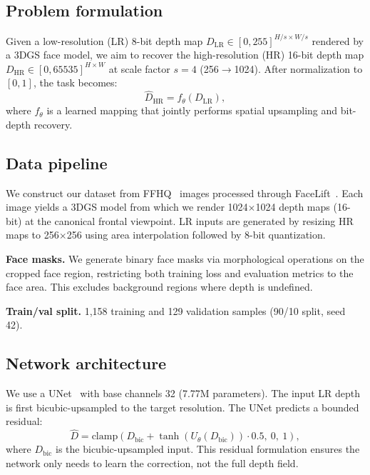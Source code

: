 \documentclass[10pt,twocolumn,letterpaper]{article}
\begin{document}
\subsection{Problem formulation}
Given a low-resolution (LR) 8-bit depth map $D_{\text{LR}} \in [0, 255]^{H/s \times W/s}$ rendered by a 3DGS face model, we aim to recover the high-resolution (HR) 16-bit depth map $D_{\text{HR}} \in [0, 65535]^{H \times W}$ at scale factor $s=4$ (256$\to$1024).
After normalization to $[0,1]$, the task becomes:
\begin{equation}
    \hat{D}_{\text{HR}} = f_\theta(D_{\text{LR}}),
\end{equation}
where $f_\theta$ is a learned mapping that jointly performs spatial upsampling and bit-depth recovery.

\subsection{Data pipeline}
\label{sec:data}

We construct our dataset from FFHQ~\cite{karras2019ffhq} images processed through FaceLift~\cite{wu2024facelift}.
Each image yields a 3DGS model from which we render 1024$\times$1024 depth maps (16-bit) at the canonical frontal viewpoint.
LR inputs are generated by resizing HR maps to 256$\times$256 using area interpolation followed by 8-bit quantization.

\textbf{Face masks.}
We generate binary face masks via morphological operations on the cropped face region, restricting both training loss and evaluation metrics to the face area.
This excludes background regions where depth is undefined.

\textbf{Train/val split.}
1{,}158 training and 129 validation samples (90/10 split, seed 42).

\subsection{Network architecture}

We use a UNet~\cite{ronneberger2015unet} with base channels 32 (7.77M parameters).
The input LR depth is first bicubic-upsampled to the target resolution.
The UNet predicts a bounded residual:
\begin{equation}
    \hat{D} = \text{clamp}\left(D_{\text{bic}} + \tanh(U_\theta(D_{\text{bic}})) \cdot 0.5,\ 0,\ 1\right),
\end{equation}
where $D_{\text{bic}}$ is the bicubic-upsampled input.
This residual formulation ensures the network only needs to learn the correction, not the full depth field.
\end{document}
